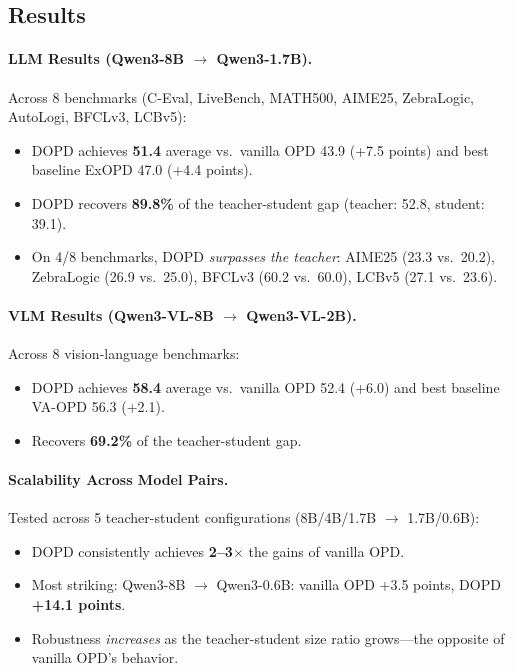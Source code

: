\documentclass[11pt,a4paper]{article}
\begin{document}
\subsection{Results}

\paragraph{LLM Results (Qwen3-8B $\to$ Qwen3-1.7B).} Across 8 benchmarks (C-Eval, LiveBench, MATH500, AIME25, ZebraLogic, AutoLogi, BFCLv3, LCBv5):
\begin{itemize}
\item DOPD achieves \textbf{51.4} average vs.\ vanilla OPD 43.9 (+7.5 points) and best baseline ExOPD 47.0 (+4.4 points).
\item DOPD recovers \textbf{89.8\%} of the teacher-student gap (teacher: 52.8, student: 39.1).
\item On 4/8 benchmarks, DOPD \emph{surpasses the teacher}: AIME25 (23.3 vs.\ 20.2), ZebraLogic (26.9 vs.\ 25.0), BFCLv3 (60.2 vs.\ 60.0), LCBv5 (27.1 vs.\ 23.6).
\end{itemize}

\paragraph{VLM Results (Qwen3-VL-8B $\to$ Qwen3-VL-2B).} Across 8 vision-language benchmarks:
\begin{itemize}
\item DOPD achieves \textbf{58.4} average vs.\ vanilla OPD 52.4 (+6.0) and best baseline VA-OPD 56.3 (+2.1).
\item Recovers \textbf{69.2\%} of the teacher-student gap.
\end{itemize}

\paragraph{Scalability Across Model Pairs.} Tested across 5 teacher-student configurations (8B/4B/1.7B $\to$ 1.7B/0.6B):
\begin{itemize}
\item DOPD consistently achieves \textbf{2--3$\times$} the gains of vanilla OPD.
\item Most striking: Qwen3-8B $\to$ Qwen3-0.6B: vanilla OPD +3.5 points, DOPD \textbf{+14.1 points}.
\item Robustness \emph{increases} as the teacher-student size ratio grows---the opposite of vanilla OPD's behavior.
\end{itemize}
\end{document}
